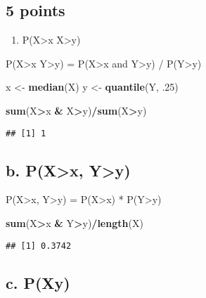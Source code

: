 \documentclass[]{article}
\newenvironment{Shaded}{\begin{snugshade}}{\end{snugshade}}
\newcommand{\KeywordTok}[1]{\textcolor[rgb]{0.13,0.29,0.53}{\textbf{#1}}}
\newcommand{\DecValTok}[1]{\textcolor[rgb]{0.00,0.00,0.81}{#1}}
\newcommand{\StringTok}[1]{\textcolor[rgb]{0.31,0.60,0.02}{#1}}
\newcommand{\OperatorTok}[1]{\textcolor[rgb]{0.81,0.36,0.00}{\textbf{#1}}}
\newcommand{\NormalTok}[1]{#1}
\providecommand{\tightlist}{%
  \setlength{\itemsep}{0pt}\setlength{\parskip}{0pt}}
\begin{document}
\subsection{5 points}\label{points}

\begin{enumerate}
\def\labelenumi{\alph{enumi}.}
\tightlist
\item
  P(X\textgreater{}x \textbar{} X\textgreater{}y)
\end{enumerate}

P(X\textgreater{}x \textbar{} Y\textgreater{}y) = P(X\textgreater{}x and
Y\textgreater{}y) / P(Y\textgreater{}y)

\begin{Shaded}
\begin{Highlighting}[]
\NormalTok{x <-}\StringTok{ }\KeywordTok{median}\NormalTok{(X)}
\NormalTok{y <-}\StringTok{ }\KeywordTok{quantile}\NormalTok{(Y, .}\DecValTok{25}\NormalTok{)}

\KeywordTok{sum}\NormalTok{(X}\OperatorTok{>}\NormalTok{x }\OperatorTok{&}\StringTok{ }\NormalTok{X}\OperatorTok{>}\NormalTok{y)}\OperatorTok{/}\KeywordTok{sum}\NormalTok{(X}\OperatorTok{>}\NormalTok{y)}
\end{Highlighting}
\end{Shaded}

\begin{verbatim}
## [1] 1
\end{verbatim}

\subsection{b. P(X\textgreater{}x, Y\textgreater{}y)}\label{b.-pxx-yy}

P(X\textgreater{}x, Y\textgreater{}y) = P(X\textgreater{}x) *
P(Y\textgreater{}y)

\begin{Shaded}
\begin{Highlighting}[]
\KeywordTok{sum}\NormalTok{(X}\OperatorTok{>}\NormalTok{x }\OperatorTok{&}\StringTok{ }\NormalTok{Y}\OperatorTok{>}\NormalTok{y)}\OperatorTok{/}\KeywordTok{length}\NormalTok{(X)}
\end{Highlighting}
\end{Shaded}

\begin{verbatim}
## [1] 0.3742
\end{verbatim}

\subsection{c. P(Xy)}\label{c.-pxy}
\end{document}
